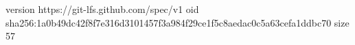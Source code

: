 version https://git-lfs.github.com/spec/v1
oid sha256:1a0b49dc42f8f7e316d3101457f3a984f29ce1f5c8aedac0c5a63cefa1ddbc70
size 57
